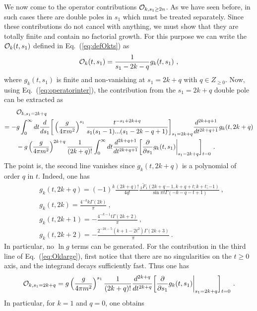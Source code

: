 \documentclass[a4paper,11pt]{article}
\begin{document}
We now come to the operator contributions ${\cal O}_{k,s_1\ge2n}$. As we have seen before, in such cases there are double poles in $s_1$ which must be treated separately. Since these contributions do not cancel with anything, we must show that they are totally finite and contain no factorial growth. For this purpose we can write the ${\cal O}_{k}(t,s_1)$ defined in Eq.~(\ref{eq:defOkts}) as 
\begin{align}
{\cal O}_{k}(t,s_1)=\frac{1}{s_1-2k-q}g_k(t,s_1) \ ,
\end{align}
where $g_k(t,s_1)$ is finite and non-vanishing at $s_1=2k+q$ with $q\in Z_{\ge 0}$. Now, using Eq.~(\ref{eq:operatorinter}),  the contribution from the $s_1=2k+q$ double pole can be extracted as
\begin{align}
&{\cal O}_{k,s_1=2k+q}\nonumber \\ =-&g\int_{0}^{\infty} dt \frac{d}{ds_1}\bigg[\left(\frac{g}{4\pi m^2}\right)^{s_1}\frac{t^{-s_1+2k+q}}{s_1(s_1-1)...(s_1-2k-q+1)} \bigg]_{s_1=2k+q}\frac{d^{2k+q+1}}{dt^{2k+q+1}}g_k(t,2k+q) \nonumber \\ 
&-g\left(\frac{g}{4\pi m^2}\right)^{2k+q}\frac{1}{(2k+q)!}\int_0^{\infty} dt\frac{d^{2k+q+1}}{dt^{2k+q+1}}\bigg[\frac{\partial}{\partial s_1}g_k(t,s_1)\bigg|_{s_1=2k+q}\bigg]_{t=0} \ . \label{eq:Oklarge}
\end{align}
The point is, the second line  vanishes since $g_k(t,2k+q)$ is a polynomial of order $q$ in $t$. Indeed, one has
\begin{align}
&g_k(t,2k+q)=(-1)^{k}\frac{(2k+q)!}{4q!}\frac{\,_2\tilde F_1(2k+q-1,k+q+t;k+t;-1)}{\sin \pi t \Gamma(-k-q-t+1)} \ , \\ 
&g_k(t,2k)=\frac{4^{-k} k \Gamma (2 k)}{\pi } \ , \\
&g_k(t,2k+1)=-\frac{4^{-k-1} t \Gamma (2 k+2)}{\pi } \ , \\
&g_k(t,2k+2)=-\frac{2^{-2 k-5} \left(k+1-2 t^2\right) \Gamma (2 k+3)}{\pi } \ .
\end{align}
In particular, no $\ln g$ terms can be generated. For the contribution in the third line of Eq.~(\ref{eq:Oklarge}), first notice that there are no singularities on the $t\ge0$ axis, and the integrand decays sufficiently fast. Thus one has
\begin{align}
{\cal O}_{k,s_1=2k+q}=g\left(\frac{g}{4\pi m^2}\right)^{s_1}\frac{1}{(2k+q)!}\frac{d^{2k+q}}{dt^{2k+q}}\bigg[\frac{\partial}{\partial s_1}g_k(t,s_1)\bigg|_{s_1=2k+q}\bigg]_{t=0} \ . \label{eq:operatorfull2}
\end{align}
In particular, for $k=1$ and $q=0$, one obtains
\end{document}
